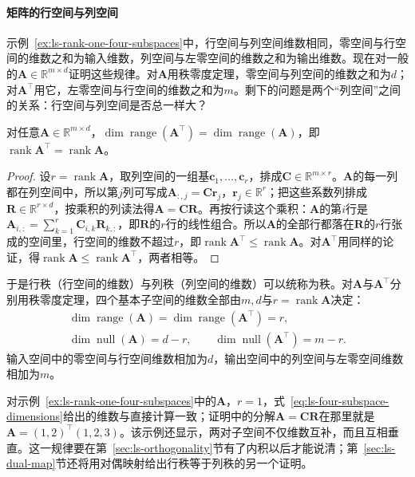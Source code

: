 \paragraph{矩阵的行空间与列空间}
示例~\ref{ex:ls-rank-one-four-subspaces}中，行空间与列空间维数相同，零空间与行空间的维数之和为输入维数，列空间与左零空间的维数之和为输出维数。现在对一般的$\bm A\in\mathbb R^{m\times d}$证明这些规律。对$\bm A$用秩零度定理，零空间与列空间的维数之和为$d$；对$\bm A^\top$用它，左零空间与行空间的维数之和为$m$。剩下的问题是两个“列空间”之间的关系：行空间与列空间是否总一样大？
\begin{theorem}[行秩等于列秩]
\label{thm:ls-row-rank-column-rank}
对任意$\bm A\in\mathbb R^{m\times d}$，$\dim\operatorname{range}(\bm A^\top)=\dim\operatorname{range}(\bm A)$，即$\operatorname{rank}\bm A^\top=\operatorname{rank}\bm A$。
\end{theorem}
\begin{proof}
设$r=\operatorname{rank}\bm A$，取列空间的一组基$\bm c_1,\ldots,\bm c_r$，排成$\bm C\in\mathbb R^{m\times r}$。$\bm A$的每一列都在列空间中，所以第$j$列可写成$\bm A_{:,j}=\bm C\bm r_j$，$\bm r_j\in\mathbb R^r$；把这些系数列排成$\bm R\in\mathbb R^{r\times d}$，按乘积的列读法得$\bm A=\bm C\bm R$。再按行读这个乘积：$\bm A$的第$i$行是$\bm A_{i,:}=\sum_{k=1}^r\bm C_{i,k}\bm R_{k,:}$，即$\bm R$的$r$行的线性组合。所以$\bm A$的全部行都落在$\bm R$的$r$行张成的空间里，行空间的维数不超过$r$，即$\operatorname{rank}\bm A^\top\leq\operatorname{rank}\bm A$。对$\bm A^\top$用同样的论证，得$\operatorname{rank}\bm A\leq\operatorname{rank}\bm A^\top$，两者相等。
\end{proof}
于是行秩（行空间的维数）与列秩（列空间的维数）可以统称为秩。对$\bm A$与$\bm A^\top$分别用秩零度定理，四个基本子空间的维数全部由$m,d$与$r=\operatorname{rank}\bm A$决定：
\begin{equation}
 \begin{gathered}
 \dim\operatorname{range}(\bm A)=\dim\operatorname{range}(\bm A^\top)=r,\\
 \dim\operatorname{null}(\bm A)=d-r,\qquad
 \dim\operatorname{null}(\bm A^\top)=m-r.
 \end{gathered}
 \label{eq:ls-four-subspace-dimensions}
\end{equation}
输入空间中的零空间与行空间维数相加为$d$，输出空间中的列空间与左零空间维数相加为$m$。

对示例~\ref{ex:ls-rank-one-four-subspaces}中的$\bm A$，$r=1$，式~\eqref{eq:ls-four-subspace-dimensions}给出的维数与直接计算一致；证明中的分解$\bm A=\bm C\bm R$在那里就是$\bm A=(1,2)^\top(1,2,3)$。该示例还显示，两对子空间不仅维数互补，而且互相垂直。这一规律要在第~\ref{sec:ls-orthogonality}节有了内积以后才能说清；第~\ref{sec:ls-dual-map}节还将用对偶映射给出行秩等于列秩的另一个证明。


